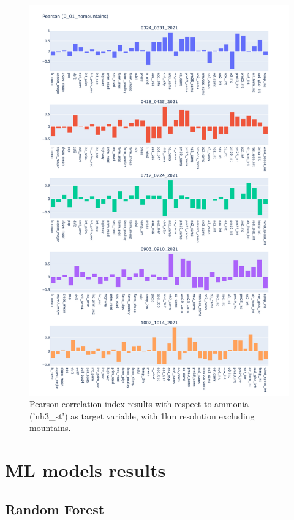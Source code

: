 \begin{figure}[H]
    \centering
    \includegraphics[scale=0.35]{images/tests/0_01_nomountainsnh3_st_pearson.png}
    \caption{Pearson correlation index results with respect to ammonia ('nh3\_st') as target variable, with 1km resolution excluding mountains.}
    
\end{figure}

\section{ML models results}
\subsection{Random Forest}


